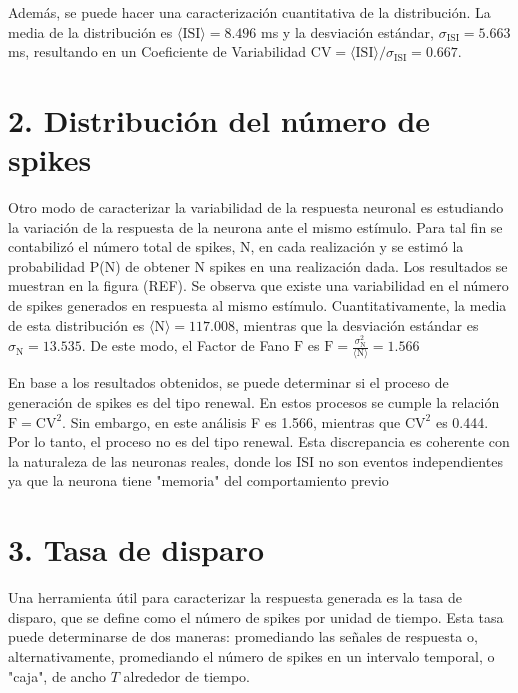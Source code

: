 \documentclass[aps,prb,twocolumn,superscriptaddress,floatfix,longbibliography]{revtex4-2}
\newcounter{para}
\begin{document}
Además, se puede hacer una caracterización cuantitativa de la distribución. La media de la distribución es $\langle \mathrm{ISI} \rangle = 8.496$ ms y la desviación estándar, $\sigma_{\mathrm{ISI}} = 5.663$ ms, resultando en un Coeficiente de Variabilidad $\mathrm{CV} = \langle \mathrm{ISI} \rangle / \sigma_{\mathrm{ISI}} =  0.667$.

\section{2. Distribución del número de spikes}



Otro modo de caracterizar la variabilidad de la respuesta neuronal es estudiando la variación de la respuesta de la neurona ante el mismo estímulo. Para tal fin se contabilizó el número total de spikes, N, en cada realización y se estimó la probabilidad P(N) de obtener N spikes en una realización dada. Los resultados se muestran en la figura (REF). Se observa que existe una variabilidad en el número de spikes generados en respuesta al mismo estímulo. Cuantitativamente, la media de esta distribución es $\langle \mathrm{N} \rangle = 117.008$, mientras que la desviación estándar es $\sigma_{\mathrm{N}} = 13.535$. De este modo, el Factor de Fano $\mathrm{F}$ es $\mathrm{F} = \frac{\sigma_\mathrm{N}^2}{\langle \mathrm{N} \rangle} = 1.566$ 

En base a los resultados obtenidos, se puede determinar si el proceso de generación de spikes es del tipo renewal. En estos procesos se cumple la relación $\mathrm{F} = \mathrm{CV}^2$. Sin embargo, en este análisis F es 1.566, mientras que $\mathrm{CV}^2$ es 0.444. Por lo tanto, el proceso no es del tipo renewal. Esta discrepancia es coherente con la naturaleza de las neuronas reales, donde los ISI no son eventos independientes ya que la neurona tiene "memoria" del comportamiento previo

\section{3. Tasa de disparo}


Una herramienta útil para caracterizar la respuesta generada es la tasa de disparo, que se define como el número de spikes por unidad de tiempo. Esta tasa puede determinarse de dos maneras: promediando las señales de respuesta o, alternativamente, promediando el número de spikes en un intervalo temporal, o "caja", de ancho \(T\) alrededor de tiempo.
\end{document}
